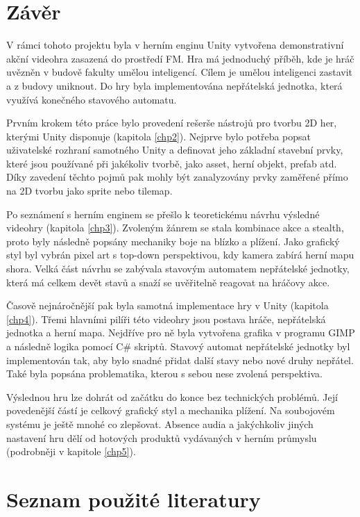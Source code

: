 \documentclass[FM,Proj]{tulthesis}
\begin{document}
	\chapter{Závěr}
	
	V rámci tohoto projektu byla v herním enginu Unity vytvořena demonstrativní akční videohra zasazená do prostředí FM. Hra má jednoduchý příběh, kde je hráč uvězněn v budově fakulty umělou inteligencí. Cílem je umělou inteligenci zastavit a z budovy uniknout. Do hry byla implementována nepřátelská jednotka, která využívá konečného stavového automatu.
	
	Prvním krokem této práce bylo provedení rešerše nástrojů pro tvorbu 2D her, kterými Unity disponuje (kapitola \ref{chp2}). Nejprve bylo potřeba popsat uživatelské rozhraní samotného Unity a definovat jeho základní stavební prvky, které jsou používané při jakékoliv tvorbě, jako asset, herní objekt, prefab atd. Díky zavedení těchto pojmů pak mohly být zanalyzovány prvky zaměřené přímo na 2D tvorbu jako sprite nebo tilemap.
	
	Po seznámení s herním enginem se přešlo k teoretickému návrhu výsledné videohry (kapitola \ref{chp3}). Zvoleným žánrem se stala kombinace akce a stealth, proto byly následně popsány mechaniky boje na blízko a plížení. Jako grafický styl byl vybrán pixel art s top-down perspektivou, kdy kamera zabírá herní mapu shora. Velká část návrhu se zabývala stavovým automatem nepřátelské jednotky, která má celkem devět stavů a snaží se uvěřitelně reagovat na hráčovy akce.
	
	Časově nejnáročnější pak byla samotná implementace hry v Unity (kapitola \ref{chp4}). Třemi hlavními pilíři této videohry jsou postava hráče, nepřátelská jednotka a herní mapa. Nejdříve pro ně byla vytvořena grafika v programu GIMP a následně logika pomocí C\# skriptů. Stavový automat nepřátelské jednotky byl implementován tak, aby bylo snadné přidat další stavy nebo nové druhy nepřátel. Také byla popsána problematika, kterou s sebou nese zvolená perspektiva.
	
	Výslednou hru lze dohrát od začátku do konce bez technických problémů. Její povedenější částí je celkový grafický styl a mechanika plížení. Na soubojovém systému je ještě mnohé co zlepšovat. Absence audia a jakýchkoliv jiných nastavení hru dělí od hotových produktů vydávaných v herním průmyslu (podrobněji v kapitole \ref{chp5}).
	
	\chapter*{Seznam použité literatury}
	\printbibliography[heading=none]
	
\end{document}
